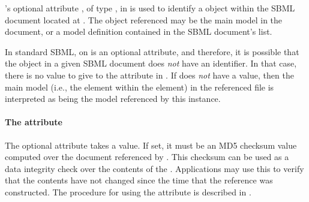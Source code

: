 \ExternalModelDefinition's optional attribute , of type
, in is used to identify a \Model object within the
SBML document located at .  The object referenced may be
the main model in the document, or a model definition contained in the
SBML document's  list.

In standard SBML,  on \Model is an optional attribute, and
therefore, it is possible that the \Model object in a given SBML
document does \emph{not} have an identifier.  In that case, there is no
value to give to the  attribute in
\ExternalModelDefinition.  If  does \emph{not} have a
value, then the main model (i.e., the  element within the
 element) in the referenced file is interpreted as being
the model referenced by this \ExternalModelDefinition instance.


\paragraph{The \hspace*{1pt} attribute}

The optional  attribute takes a  value.  If
set, it must be an MD5 checksum value computed over the document
referenced by .  This checksum can be used as a data integrity
check over the contents of the .  Applications may use
this to verify that the contents have not changed since the time that
the \ExternalModelDefinition reference was constructed.  The procedure
for using the  attribute is described in
.

